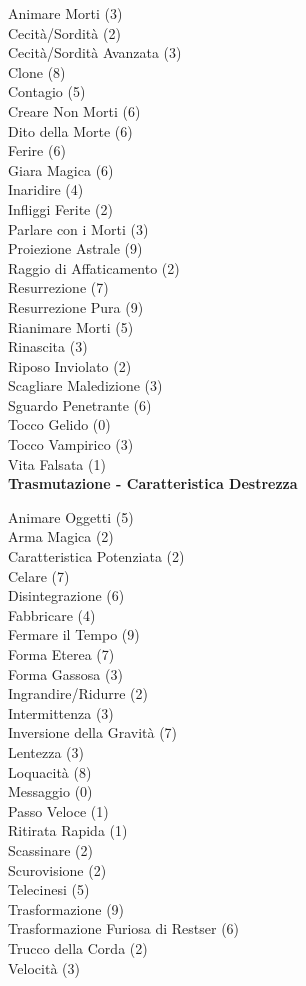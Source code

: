 \begin{multicols}{3}
{	
	Animare Morti (3)\\
	Cecità/Sordità (2)\\
	Cecità/Sordità Avanzata (3)\\
	Clone (8)\\
	Contagio (5)\\
	Creare Non Morti (6)\\
	Dito della Morte (6)\\
	Ferire (6)\\
	Giara Magica (6)\\
	Inaridire (4)\\
	Infliggi Ferite (2)\\
	Parlare con i Morti (3)\\
	Proiezione Astrale (9)\\
	Raggio di Affaticamento (2)\\
	Resurrezione (7)\\
	Resurrezione Pura (9)\\
	Rianimare Morti (5)\\
	Rinascita (3)\\
	Riposo Inviolato (2)\\
	Scagliare Maledizione (3)\\
	Sguardo Penetrante (6)\\
	Tocco Gelido (0)\\
	Tocco Vampirico (3)\\
	Vita Falsata (1)\\

	\medskip\textbf{Trasmutazione - Caratteristica Destrezza}

	Animare Oggetti (5)\\
	Arma Magica (2)\\
	Caratteristica Potenziata (2)\\
	Celare (7)\\
	Disintegrazione (6)\\
	Fabbricare (4)\\
	Fermare il Tempo (9)\\
	Forma Eterea (7)\\
	Forma Gassosa (3)\\
	Ingrandire/Ridurre (2)\\
	Intermittenza (3)\\
	Inversione della Gravità (7)\\
	Lentezza (3)\\
	Loquacità (8)\\
	Messaggio (0)\\
	Passo Veloce (1)\\
	Ritirata Rapida (1)\\
	Scassinare (2)\\
	Scurovisione (2)\\
	Telecinesi (5)\\
	Trasformazione (9)\\
	Trasformazione Furiosa di Restser (6)\\
	Trucco della Corda (2)\\
	Velocità (3)\\

}
\end{multicols}
